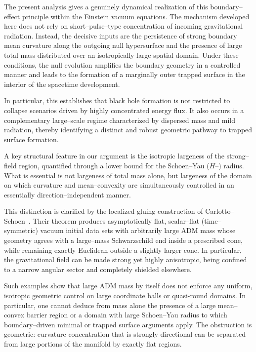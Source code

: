 \documentclass{amsart}
\begin{document}
\noindent The present analysis gives a genuinely dynamical realization of this boundary–effect principle within the Einstein vacuum equations. The mechanism developed here does not rely on short–pulse–type concentration of incoming gravitational radiation. Instead, the decisive inputs are the persistence of strong boundary mean curvature along the outgoing null hypersurface and the presence of large total mass distributed over an isotropically large spatial domain. Under these conditions, the null evolution amplifies the boundary geometry in a controlled manner and leads to the formation of a marginally outer trapped surface in the interior of the spacetime development.

\noindent In particular, this establishes that black hole formation is not restricted to collapse scenarios driven by highly concentrated energy flux. It also occurs in a complementary large–scale regime characterized by dispersed mass and mild radiation, thereby identifying a distinct and robust geometric pathway to trapped surface formation.


\medskip
\noindent A key structural feature in our argument is the isotropic largeness of the strong–field region, quantified through a lower bound for the Schoen–Yau ($H$–) radius. What is essential is not largeness of total mass alone, but largeness of the domain on which curvature and mean–convexity are simultaneously controlled in an essentially direction–independent manner.

\noindent This distinction is clarified by the localized gluing construction of Carlotto–Schoen~\cite{carloto}. Their theorem produces asymptotically flat, scalar–flat (time–symmetric) vacuum initial data sets with arbitrarily large ADM mass whose geometry agrees with a large–mass Schwarzschild end inside a prescribed cone, while remaining exactly Euclidean outside a slightly larger cone. In particular, the gravitational field can be made strong yet highly anisotropic, being confined to a narrow angular sector and completely shielded elsewhere.

\noindent Such examples show that large ADM mass by itself does not enforce any uniform, isotropic geometric control on large coordinate balls or quasi-round domains. In particular, one cannot deduce from mass alone the presence of a large mean–convex barrier region or a domain with large Schoen–Yau radius to which boundary–driven minimal or trapped surface arguments apply. The obstruction is geometric: curvature concentration that is strongly directional can be separated from large portions of the manifold by exactly flat regions.
\end{document}
